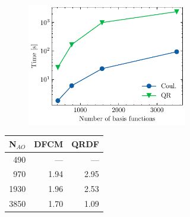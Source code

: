 \begin{figure}
\begin{subfigure}{\textwidth}

\begin{subfigure}{0.45\textwidth}
\vspace{0pt}
\centering
\includegraphics[width=\textwidth]{Pics/qrtime_alkan}
\end{subfigure}
\hfill
\begin{subtable}{0.45\textwidth}
\centering
\begin{tabular}{rrr}
\hline
N$_{AO}$ & DFCM & QRDF \\ \hline
490 & --- & --- \\ 
970 & 1.94 & 2.95 \\ 
1930 & 1.96 & 2.53 \\ 
3850 & 1.70 & 1.09 \\ \hline
\end{tabular}
\end{subtable}
\caption{}
\label{fig:GS_BTIME_ALKAN}
\end{subfigure}

\vspace{1.5\baselineskip}


\end{figure}
